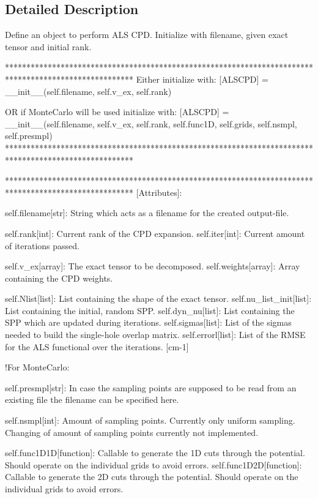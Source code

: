 \subsection{Detailed Description}
\begin{DoxyVerb}Define an object to perform ALS CPD. Initialize with filename, given exact tensor and initial rank.

******************************************************************************************************
Either initialize with:
[ALSCPD] = __init__(self.filename, self.v_ex, self.rank)

OR if MonteCarlo will be used initialize with:
[ALSCPD] = __init__(self.filename, self.v_ex, self.rank, self.func1D, self.grids, self.nsmpl, self.presmpl)
******************************************************************************************************
   
******************************************************************************************************
[Attributes]:

        self.filename[str]: String which acts as a filename for the created output-file.     
        
        self.rank[int]: Current rank of the CPD expansion.
        self.iter[int]: Current amount of iterations passed.
        
        self.v_ex[array]: The exact tensor to be decomposed.
        self.weights[array]: Array containing the CPD weights.
        
        self.Nlist[list]: List containing the shape of the exact tensor.
        self.nu_list_init[list]: List containing the initial, random SPP.
        self.dyn_nu[list]: List containing the SPP which are updated during iterations.
        self.sigmas[list]: List of the sigmas needed to build the single-hole overlap matrix.
        self.errorl[list]: List of the RMSE for the ALS functional over the iterations. [cm-1]
        
   !For MonteCarlo:
        
        self.presmpl[str]: In case the sampling points are supposed to be read from an existing file
                    the filename can be specified here.
        
        self.nsmpl[int]: Amount of sampling points. Currently only uniform sampling. Changing of 
                    amount of sampling points currently not implemented.
                   
        self.func1D1D[function]: Callable to generate the 1D cuts through the potential. Should operate
                    on the individual grids to avoid errors.
        self.func1D2D[function]: Callable to generate the 2D cuts through the potential. Should operate
                    on the individual grids to avoid errors.
                    

\end{DoxyVerb}
